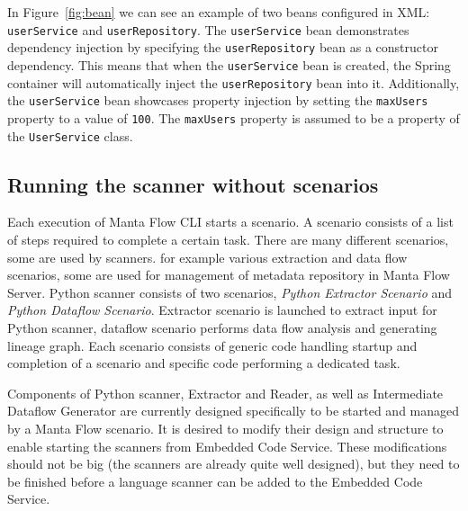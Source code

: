 \par
In Figure~\ref{fig:bean} we can see an example of two beans configured in XML: \texttt{userService} and \texttt{userRepository}. The \texttt{userService} bean demonstrates dependency injection by specifying the \texttt{userRepository} bean as a constructor dependency. This means that when the \texttt{userService} bean is created, the Spring container will automatically inject the \texttt{userRepository} bean into it. Additionally, the \texttt{userService} bean showcases property injection by setting the \texttt{maxUsers} property to a value of \texttt{100}. The \texttt{maxUsers} property is assumed to be a property of the \texttt{UserService} class.

\subsection{Running the scanner without scenarios}
Each execution of Manta Flow CLI starts a scenario. A scenario consists of a list of steps required to complete a certain task. There are many different scenarios, some are used by scanners. for example various extraction and data flow scenarios, some are used for management of metadata repository in Manta Flow Server. Python scanner consists of two scenarios, \textit{Python Extractor Scenario} and \textit{Python Dataflow Scenario}. Extractor scenario is launched to extract input for Python scanner, dataflow scenario performs data flow analysis and generating lineage graph. Each scenario consists of generic code handling startup and completion of a scenario and specific code performing a dedicated task.
\par
Components of Python scanner, Extractor and Reader, as well as Intermediate Dataflow Generator are currently designed specifically to be started and managed by a Manta Flow scenario. It is desired to modify their design and structure to enable starting the scanners from Embedded Code Service. These modifications should not be big (the scanners are already quite well designed), but they need to be finished before a language scanner can be added to the Embedded Code Service.

